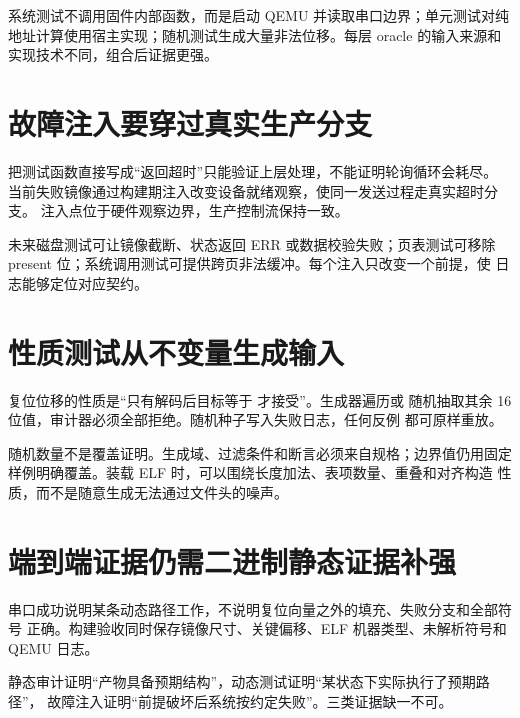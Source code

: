 系统测试不调用固件内部函数，而是启动 QEMU 并读取串口边界；单元测试对纯
地址计算使用宿主实现；随机测试生成大量非法位移。每层 oracle 的输入来源和
实现技术不同，组合后证据更强。

\section{故障注入要穿过真实生产分支}

把测试函数直接写成“返回超时”只能验证上层处理，不能证明轮询循环会耗尽。
当前失败镜像通过构建期注入改变设备就绪观察，使同一发送过程走真实超时分支。
注入点位于硬件观察边界，生产控制流保持一致。

未来磁盘测试可让镜像截断、状态返回 ERR 或数据校验失败；页表测试可移除
present 位；系统调用测试可提供跨页非法缓冲。每个注入只改变一个前提，使
日志能够定位对应契约。

\section{性质测试从不变量生成输入}

复位位移的性质是“只有解码后目标等于  才接受”。生成器遍历或
随机抽取其余 16 位值，审计器必须全部拒绝。随机种子写入失败日志，任何反例
都可原样重放。

随机数量不是覆盖证明。生成域、过滤条件和断言必须来自规格；边界值仍用固定
样例明确覆盖。装载 ELF 时，可以围绕长度加法、表项数量、重叠和对齐构造
性质，而不是随意生成无法通过文件头的噪声。

\section{端到端证据仍需二进制静态证据补强}

串口成功说明某条动态路径工作，不说明复位向量之外的填充、失败分支和全部符号
正确。构建验收同时保存镜像尺寸、关键偏移、ELF 机器类型、未解析符号和 QEMU
日志。

\begin{keyidea}
静态审计证明“产物具备预期结构”，动态测试证明“某状态下实际执行了预期路径”，
故障注入证明“前提破坏后系统按约定失败”。三类证据缺一不可。
\end{keyidea}

